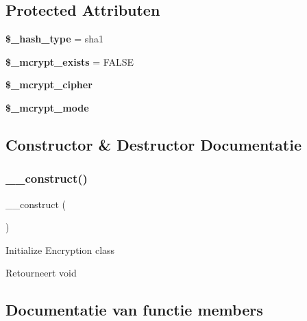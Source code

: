 \subsection*{Protected Attributen}
\begin{DoxyCompactItemize}
\item 
\mbox{\label{class_c_i___encrypt_a04e9d4ea0e45fc04c07aa1e291e17412}} 
{\bfseries \$\+\_\+hash\+\_\+type} = \textquotesingle{}sha1\textquotesingle{}
\item 
\mbox{\label{class_c_i___encrypt_aaf4246798dad057cc4e294706e5e4e37}} 
{\bfseries \$\+\_\+mcrypt\+\_\+exists} = F\+A\+L\+SE
\item 
\mbox{\label{class_c_i___encrypt_ab2cdedd99c4818b191c667f5e081a2db}} 
{\bfseries \$\+\_\+mcrypt\+\_\+cipher}
\item 
\mbox{\label{class_c_i___encrypt_ace4d98b5320c7fe75e6a38505abcdb82}} 
{\bfseries \$\+\_\+mcrypt\+\_\+mode}
\end{DoxyCompactItemize}


\subsection{Constructor \& Destructor Documentatie}
\mbox{\label{class_c_i___encrypt_a095c5d389db211932136b53f25f39685}} 
\subsubsection{\texorpdfstring{\_\_construct()}{\_\_construct()}}
{\footnotesize\ttfamily \+\_\+\+\_\+construct (\begin{DoxyParamCaption}{ }\end{DoxyParamCaption})}

Initialize Encryption class

\begin{DoxyReturn}{Retourneert}
void 
\end{DoxyReturn}


\subsection{Documentatie van functie members}
\mbox{\label{class_c_i___encrypt_ada423e99876a54e7bc33afc9899d01a2}} 
